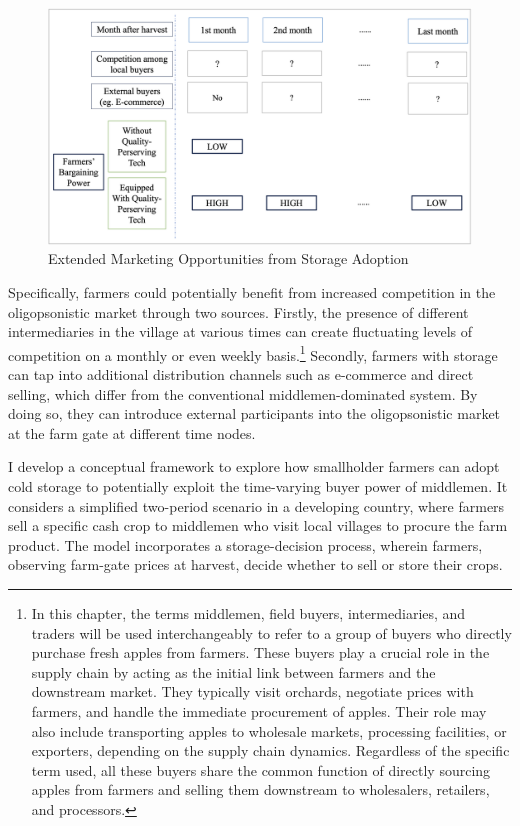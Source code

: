 \begin{figure}[ht!]
\centering
\includegraphics[width=1\textwidth]{figures/graphic_demo.png}
\caption{Extended Marketing Opportunities from Storage Adoption}
\label{Figure: Demo}
\end{figure}

Specifically, farmers could potentially benefit from increased competition in the oligopsonistic market through two sources. Firstly, the presence of different intermediaries in the village at various times can create fluctuating levels of competition on a monthly or even weekly basis.\footnote{In this chapter, the terms middlemen, field buyers, intermediaries, and traders will be used interchangeably to refer to a group of buyers who directly purchase fresh apples from farmers. These buyers play a crucial role in the supply chain by acting as the initial link between farmers and the downstream market. They typically visit orchards, negotiate prices with farmers, and handle the immediate procurement of apples. Their role may also include transporting apples to wholesale markets, processing facilities, or exporters, depending on the supply chain dynamics. Regardless of the specific term used, all these buyers share the common function of directly sourcing apples from farmers and selling them downstream to wholesalers, retailers, and processors.}  Secondly, farmers with storage can tap into additional distribution channels such as e-commerce and direct selling, which differ from the conventional middlemen-dominated system. By doing so, they can introduce external participants into the oligopsonistic market at the farm gate at different time nodes. 

I develop a conceptual framework to explore how smallholder farmers can adopt cold storage to potentially exploit the time-varying buyer power of middlemen. It considers a simplified two-period scenario in a developing country, where farmers sell a specific cash crop to middlemen who visit local villages to procure the farm product. The model incorporates a storage-decision process, wherein farmers, observing farm-gate prices at harvest, decide whether to sell or store their crops.

